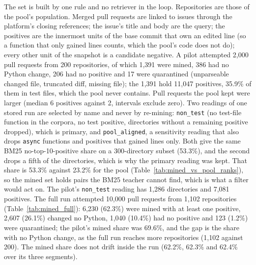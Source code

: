 \documentclass[10pt,twocolumn]{article}
\makeatletter
\renewcommand\paragraph{\@startsection{paragraph}{4}{\z@}{3pt}{-0.5em}{\normalfont\bfseries}}
\makeatother
\begin{document}
\paragraph{The mined set.} The set is built by one rule and no retriever in the loop. Repositories are those of the pool's
population. Merged pull requests are linked to issues through the platform's closing references; the issue's title and
body are the query; the positives are the innermost units of the base commit that own an edited line (so a function that
only gained lines counts, which the pool's code does not do); every other unit of the snapshot is a candidate negative.
A pilot attempted 2,000 pull requests from 200 repositories, of which 1,391 were mined, 386 had no Python change, 206
had no positive and 17 were quarantined (unparseable changed file, truncated diff, missing file); the 1,391 hold
11,047 positives, 35.9\% of them in test files, which the pool never contains. %
Pull requests the pool kept were larger (median 6 positives against 2, intervals exclude zero). %
Two readings of one stored run are selected by name and never by re-mining: \texttt{non\_test} (no test-file function in the corpora,
no test positive, directories without a remaining positive dropped), which is primary, and \texttt{pool\_aligned}, a sensitivity
reading that also drops \texttt{async} functions and positives that gained lines only. Both give the same BM25 no-top-10-positive
share on a 300-directory subset (53.3\%), and the second drops a fifth of the directories, which is why the primary reading was kept. %
That share is 53.3\% against 23.2\% for the pool (Table~\ref{tab:mined_vs_pool_ranks}), so the mined set holds pairs the BM25 teacher cannot find, which
is what a filter would act on. The pilot's \texttt{non\_test} reading has 1,286 directories and 7,081 positives. %
The full run attempted 10,000 pull requests from 1,102 repositories (Table~\ref{tab:mined_full}): 6,230 (62.3\%) were mined with at least one positive, 2,607 (26.1\%) changed no Python,
1,040 (10.4\%) had no positive and 123 (1.2\%) were quarantined; the pilot's mined share was 69.6\%, and the gap is the share with no Python change, as the full run reaches more repositories (1,102 against 200). %
The mined share does not drift inside the run (62.2\%, 62.3\% and 62.4\% over its three segments). %
\end{document}
